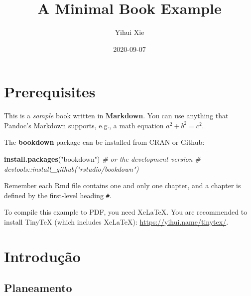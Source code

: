 \documentclass[
]{book}
\title{A Minimal Book Example}
\author{Yihui Xie}
\date{2020-09-07}
\newenvironment{Shaded}{\begin{snugshade}}{\end{snugshade}}
\newcommand{\CommentTok}[1]{\textcolor[rgb]{0.56,0.35,0.01}{\textit{#1}}}
\newcommand{\KeywordTok}[1]{\textcolor[rgb]{0.13,0.29,0.53}{\textbf{#1}}}
\newcommand{\NormalTok}[1]{#1}
\newcommand{\StringTok}[1]{\textcolor[rgb]{0.31,0.60,0.02}{#1}}
\begin{document}
\maketitle

{
\setcounter{tocdepth}{1}
\tableofcontents
}
\hypertarget{prerequisites}{%
\chapter{Prerequisites}\label{prerequisites}}

This is a \emph{sample} book written in \textbf{Markdown}. You can use anything that Pandoc's Markdown supports, e.g., a math equation \(a^2 + b^2 = c^2\).

The \textbf{bookdown} package can be installed from CRAN or Github:

\begin{Shaded}
\begin{Highlighting}[]
\KeywordTok{install.packages}\NormalTok{(}\StringTok{"bookdown"}\NormalTok{)}
\CommentTok{# or the development version}
\CommentTok{# devtools::install_github("rstudio/bookdown")}
\end{Highlighting}
\end{Shaded}

Remember each Rmd file contains one and only one chapter, and a chapter is defined by the first-level heading \texttt{\#}.

To compile this example to PDF, you need XeLaTeX. You are recommended to install TinyTeX (which includes XeLaTeX): \url{https://yihui.name/tinytex/}.

\hypertarget{intro}{%
\chapter{Introdução}\label{intro}}

\hypertarget{planeamento}{%
\section{Planeamento}\label{planeamento}}
\end{document}
